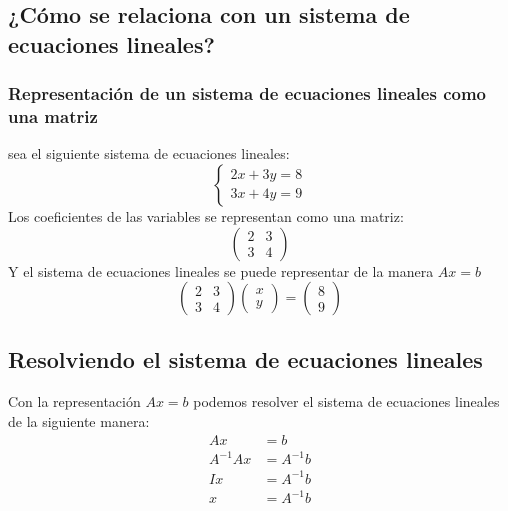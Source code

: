\documentclass{beamer}
\begin{document}
    \subsection{¿Cómo se relaciona con un sistema de ecuaciones lineales?}
    \begin{frame}
        \frametitle{Representación de un sistema de ecuaciones lineales como una matriz}
        sea el siguiente sistema de ecuaciones lineales:
        $$
        \begin{cases}
            2x + 3y = 8 \\
            3x + 4y = 9
        \end{cases}
        $$
        Los coeficientes de las variables se representan como una matriz:
        $$
        \begin{pmatrix}
            2 & 3 \\
            3 & 4
        \end{pmatrix}
        $$
        Y el sistema de ecuaciones lineales se puede representar de la manera $Ax=b$
        $$
        \begin{pmatrix}
            2 & 3 \\
            3 & 4
        \end{pmatrix}
        \begin{pmatrix}
            x \\
            y
        \end{pmatrix}
        =
        \begin{pmatrix}
            8 \\
            9
        \end{pmatrix}
        $$

    \end{frame}
    \subsection{Resolviendo el sistema de ecuaciones lineales}

    \begin{frame}
        Con la representación $Ax=b$ podemos resolver el sistema de ecuaciones lineales de la siguiente manera:
        \begin{align*}
            Ax &= b \\
            A^{-1}Ax &= A^{-1}b \\
            Ix &= A^{-1}b \\
            x &= A^{-1}b
        \end{align*}
    \end{frame}
\end{document}
